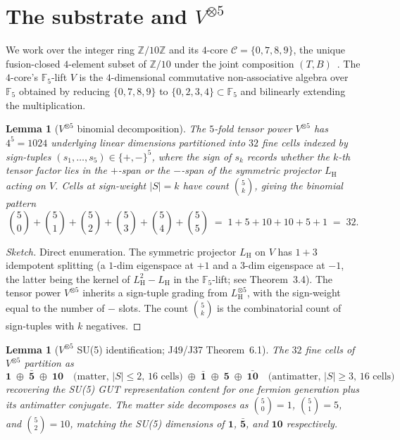 \documentclass[11pt,reqno]{amsart}
\theoremstyle{plain}
\newtheorem{lemma}[theorem]{Lemma}
\theoremstyle{definition}
\theoremstyle{remark}
\newcommand{\Z}{\mathbb{Z}}
\newcommand{\F}{\mathbb{F}}
\DeclareMathOperator{\HARM}{H}    %
\newcommand{\Cfour}{\mathcal{C}}  %
\newcommand{\rep}[1]{\mathbf{#1}}
\newcommand{\barrep}[1]{\bar{\mathbf{#1}}}
\begin{document}
\section{The substrate and \texorpdfstring{$V^{\otimes 5}$}{V tensor 5}}\label{sec:setup}

We work over the integer ring $\Z/10\Z$ and its $4$-core
$\Cfour = \{0, 7, 8, 9\}$, the unique fusion-closed $4$-element
subset of $\Z/10$ under the joint composition $(T,
B)$~\cite{SandersGish2026FourCore}. The $4$-core's $\F_5$-lift
$V$ is the $4$-dimensional commutative non-associative algebra
over $\F_5$ obtained by reducing $\{0,7,8,9\}$ to
$\{0,2,3,4\} \subset \F_5$ and bilinearly extending the
multiplication.

\begin{lemma}[$V^{\otimes 5}$ binomial decomposition]\label{lem:binomial}
The $5$-fold tensor power $V^{\otimes 5}$ has $4^{5} = 1024$
underlying linear dimensions partitioned into $32$ fine cells
indexed by sign-tuples $(s_{1}, \ldots, s_{5}) \in \{+,-\}^{5}$,
where the sign of $s_{k}$ records whether the $k$-th tensor
factor lies in the $+$-span or the $-$-span of the symmetric
projector $L_{\HARM}$ acting on $V$. Cells at sign-weight
$|S| = k$ have count $\binom{5}{k}$, giving the binomial pattern
\[
  \binom{5}{0} + \binom{5}{1} + \binom{5}{2} + \binom{5}{3} + \binom{5}{4} + \binom{5}{5}
  \;=\; 1 + 5 + 10 + 10 + 5 + 1 \;=\; 32.
\]
\end{lemma}

\begin{proof}[Sketch]
Direct enumeration. The symmetric projector $L_{\HARM}$ on $V$
has $1+3$ idempotent splitting (a $1$-dim eigenspace at $+1$
and a $3$-dim eigenspace at $-1$, the latter being the kernel
of $L_{\HARM}^2 - L_{\HARM}$ in the $\F_5$-lift; see
\cite{SandersGish2026DiscreteDirac} Theorem~3.4). The tensor
power $V^{\otimes 5}$ inherits a sign-tuple grading from
$L_{\HARM}^{\otimes 5}$, with the sign-weight equal to the
number of $-$ slots. The count $\binom{5}{k}$ is the
combinatorial count of sign-tuples with $k$ negatives.
\end{proof}

\begin{lemma}[$V^{\otimes 5}$ SU(5) identification; J49/J37 Theorem~6.1]\label{lem:vtensor5}
The $32$ fine cells of $V^{\otimes 5}$ partition as
\[
  \rep{1} \;\oplus\; \barrep{5} \;\oplus\; \rep{10}
  \quad \text{(matter, $|S| \leq 2$, $16$ cells)}
  \;\oplus\;
  \barrep{1} \;\oplus\; \rep{5} \;\oplus\; \barrep{10}
  \quad \text{(antimatter, $|S| \geq 3$, $16$ cells)}
\]
recovering the SU(5) GUT representation content for one
fermion generation plus its antimatter conjugate. The matter
side decomposes as $\binom{5}{0} = 1$, $\binom{5}{1} = 5$, and
$\binom{5}{2} = 10$, matching the SU(5) dimensions of $\rep{1}$,
$\barrep{5}$, and $\rep{10}$ respectively.
\end{lemma}
\end{document}
